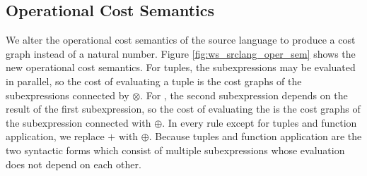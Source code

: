 \subsection{Operational Cost Semantics}
%
We alter the operational cost semantics of the source language to produce a cost
graph instead of a natural number. Figure \ref{fig:ws_srclang_oper_sem} shows
the new operational cost semantics. For tuples, the subexpressions may be evaluated
in parallel, so the cost of evaluating a tuple is the cost graphs of the
subexpressions connected by $\otimes$.  For , the second subexpression
depends on the result of the first subexpression, so the cost of evaluating the
 is the cost graphs of the subexpression connected with $\oplus$. In
every rule except for tuples and function application, we replace $+$ with
$\oplus$. Because tuples and function application are the two syntactic
forms which consist of multiple subexpressions whose evaluation does not depend
on each other.
%
